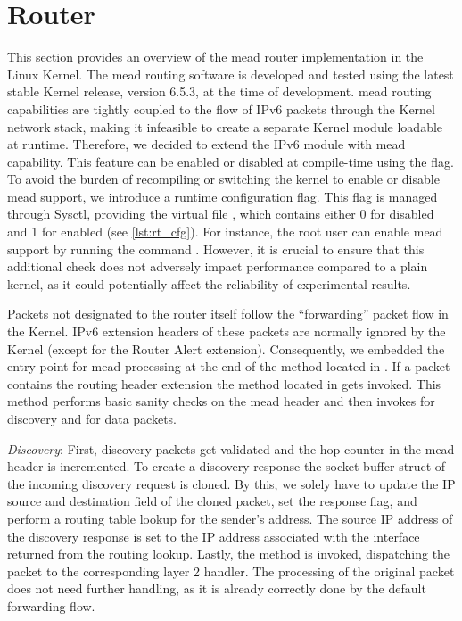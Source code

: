 \section{Router} %
\label{sec:Router}
This section provides an overview of the \gls{mead} router implementation in the
    Linux Kernel.
The \gls{mead} routing software is developed and tested using the latest stable
    Kernel release, version 6.5.3, at the time of development.
\gls{mead} routing capabilities are tightly coupled to the flow of IPv6 packets
    through the Kernel network stack, making it infeasible to create a separate
    Kernel module loadable at runtime.
Therefore, we decided to extend the IPv6 module with \gls{mead} capability.
This feature can be enabled or disabled at compile-time using the
     flag.
To avoid the burden of recompiling or switching the kernel to enable or disable
    \gls{mead} support, we introduce a runtime configuration flag.
This flag is managed through Sysctl, providing the virtual file
    , which contains either 0 for
    disabled and 1 for enabled (see \autoref{lst:rt_cfg}).
For instance, the root user can enable \gls{mead} support by running the command
    .
However, it is crucial to ensure that this additional check does not adversely
    impact performance compared to a plain kernel, as it could potentially
    affect the reliability of experimental results.

Packets not designated to the router itself follow the ``forwarding'' packet
    flow in the Kernel.
IPv6 extension headers of these packets are normally ignored by the Kernel
    (except for the Router Alert extension).
Consequently, we embedded the entry point for \gls{mead} processing at the end of
    the  method located in
    .
If a packet contains the routing header extension the 
    method located in  gets invoked.
This method performs basic sanity checks on the \gls{mead} header and then
    invokes  for discovery and
     for data packets.

\textit{Discovery}: First, discovery packets get validated and the hop counter
    in the \gls{mead} header is incremented.
To create a discovery response the socket buffer struct of the incoming
    discovery request is cloned.
By this, we solely have to update the IP source and destination field of the
    cloned packet, set the response flag, and perform a routing table lookup
    for the sender's address.
The source IP address of the discovery response is set to the IP address
    associated with the interface returned from the routing lookup.
Lastly, the  method is invoked, dispatching the packet to
    the corresponding layer 2 handler.
The processing of the original packet does not need further handling, as it is
    already correctly done by the default forwarding flow.

